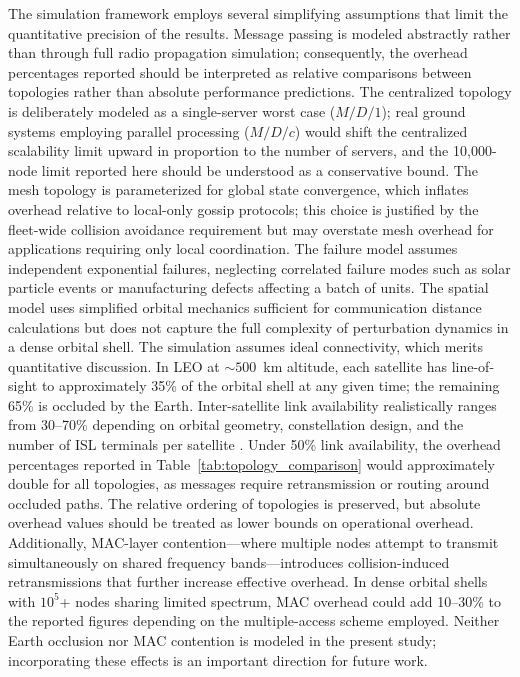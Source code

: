 \documentclass[journal]{IEEEtran}
\begin{document}
The simulation framework employs several simplifying assumptions that limit the quantitative precision of the results. Message passing is modeled abstractly rather than through full radio propagation simulation; consequently, the overhead percentages reported should be interpreted as relative comparisons between topologies rather than absolute performance predictions. The centralized topology is deliberately modeled as a single-server worst case ($M/D/1$); real ground systems employing parallel processing ($M/D/c$) would shift the centralized scalability limit upward in proportion to the number of servers, and the 10{,}000-node limit reported here should be understood as a conservative bound. The mesh topology is parameterized for global state convergence, which inflates overhead relative to local-only gossip protocols; this choice is justified by the fleet-wide collision avoidance requirement but may overstate mesh overhead for applications requiring only local coordination. The failure model assumes independent exponential failures, neglecting correlated failure modes such as solar particle events or manufacturing defects affecting a batch of units. The spatial model uses simplified orbital mechanics sufficient for communication distance calculations but does not capture the full complexity of perturbation dynamics in a dense orbital shell. The simulation assumes ideal connectivity, which merits quantitative discussion. In LEO at ${\sim}500$~km altitude, each satellite has line-of-sight to approximately 35\% of the orbital shell at any given time; the remaining 65\% is occluded by the Earth. Inter-satellite link availability realistically ranges from 30--70\% depending on orbital geometry, constellation design, and the number of ISL terminals per satellite \cite{handley_2018}. Under 50\% link availability, the overhead percentages reported in Table~\ref{tab:topology_comparison} would approximately double for all topologies, as messages require retransmission or routing around occluded paths. The relative ordering of topologies is preserved, but absolute overhead values should be treated as lower bounds on operational overhead. Additionally, MAC-layer contention---where multiple nodes attempt to transmit simultaneously on shared frequency bands---introduces collision-induced retransmissions that further increase effective overhead. In dense orbital shells with $10^5$+ nodes sharing limited spectrum, MAC overhead could add 10--30\% to the reported figures depending on the multiple-access scheme employed. Neither Earth occlusion nor MAC contention is modeled in the present study; incorporating these effects is an important direction for future work.
\end{document}
